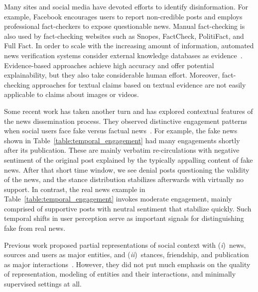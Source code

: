 \documentclass[sigconf]{acmart}
\theoremstyle{definition}
\theoremstyle{hypothesis}
\begin{document}
Many sites and social media have devoted efforts to identify disinformation. For example, Facebook encourages users to report non-credible posts
and employs professional fact-checkers to expose questionable news. Manual fact-checking is also used by fact-checking websites such as Snopes,
FactCheck,
PolitiFact,
and Full Fact.
In order to scale with the increasing amount of information, automated news verification systems consider external knowledge databases as evidence~\cite{hassan2017claimbuster,thorne2018factcheck,popat2018credeye}. Evidence-based approaches achieve high accuracy and offer potential explainability, but they also take considerable human effort.
Moreover, fact-checking approaches for textual claims based on textual evidence are not easily applicable to claims about images or videos.

Some recent work has taken another turn and has explored contextual features of the news dissemination process. 
They observed distinctive engagement patterns when social users face fake versus factual news~\cite{ma2016detecting,jin2016news}.
For example, the fake news shown in Table~\ref{table:temporal_engagement} had many engagements shortly after its publication. These are mainly verbatim 
re-circulations with negative sentiment of the original post explained by the typically appalling content of fake news. After that short time window, we see denial 
posts questioning the validity of the news, and the stance distribution stabilizes afterwards with virtually no support. In contrast, the real news example in Table~\ref{table:temporal_engagement} invokes moderate engagement, mainly comprised of supportive posts with neutral sentiment that stabilize quickly. Such temporal shifts in user perception serve as important signals for distinguishing fake from real news. 

Previous work proposed partial representations of social context with (\emph{i})~news, sources and users as major entities, and (\emph{ii})~stances, friendship, and publication as major interactions~\cite{jin2014news,popat2017truth,shu2019beyond,popat2016credibility}. 
However, they did not put much emphasis on the quality of representation, modeling of entities and their interactions, and minimally supervised settings at all.  
\end{document}
